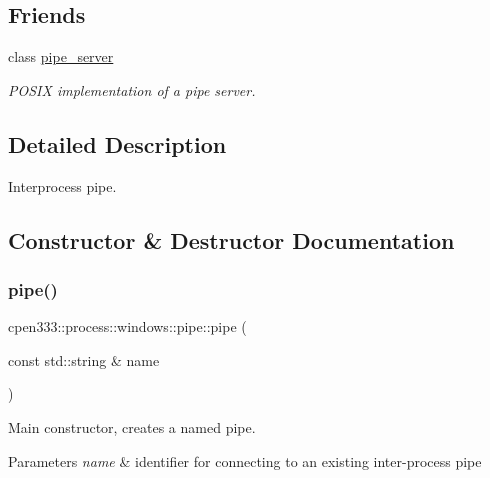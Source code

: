 \subsection*{Friends}
\begin{DoxyCompactItemize}
\item 
class \hyperlink{classcpen333_1_1process_1_1windows_1_1pipe_ab111e84ef31179e72c2bd2e58e2042b0}{pipe\+\_\+server}
\begin{DoxyCompactList}\small\item\em P\+O\+S\+IX implementation of a pipe server. \end{DoxyCompactList}\end{DoxyCompactItemize}


\subsection{Detailed Description}
Interprocess pipe. 

\subsection{Constructor \& Destructor Documentation}
\mbox{\label{classcpen333_1_1process_1_1windows_1_1pipe_a2b63d6b649093ce1b883c3ae418db620}} 
\subsubsection{\texorpdfstring{pipe()}{pipe()}\hspace{0.1cm}{\footnotesize\ttfamily [1/2]}}
{\footnotesize\ttfamily cpen333\+::process\+::windows\+::pipe\+::pipe (\begin{DoxyParamCaption}\item[{const std\+::string \&}]{name }\end{DoxyParamCaption})\hspace{0.3cm}{\ttfamily [inline]}}



Main constructor, creates a named pipe. 


\begin{DoxyParams}{Parameters}
{\em name} & identifier for connecting to an existing inter-\/process pipe \\
\hline
\end{DoxyParams}
\mbox{\label{classcpen333_1_1process_1_1windows_1_1pipe_a4697295dcf61f8f1deb875adfb2ea303}} 
